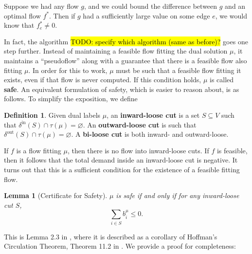 \documentclass[11pt]{article}
\newtheorem{lemma}[theorem]{Lemma}
\theoremstyle{definition}
\newtheorem{definition}{Definition}[section]
\theoremstyle{definition}
\newcommand{\biu}{b_{i}^{\mu}}
\newcommand{\din}{\delta^{\text{in}}}
\newcommand{\dout}{\delta^{\text{out}}}
\newcommand{\todo}[1]{\hl{TODO: #1}}
\begin{document}
	Suppose we had any flow $g$, and we could bound the difference between $g$ and an optimal
	flow $f^*$. Then if $g$ had a sufficiently large value on some edge $e$, we would know that
	$f^*_e \neq 0$.
	
	In fact, the algorithm \todo{specify which algorithm (same as before)?} goes one step further. Instead of maintaining a feasible flow
	fitting the dual solution $\mu$, it maintains a ``pseudoflow'' along with a guarantee
	that there is a feasible flow also fitting $\mu$. In order for this to work, $\mu$
	must be such that a feasible flow fitting it exists, even if that flow is never
	computed. If this condition holds, $\mu$ is called \textbf{safe}. An equivalent
	formulation of safety, which is easier to reason about, is as follows. To simplify
	the exposition, we define 
	\begin{definition}
		Given dual labels $\mu$, an \textbf{inward-loose cut} is a set $S \subseteq V$ such that
		$\din(S) \cap \tau(\mu) = \varnothing$. An \textbf{outward-loose cut}
		is such that $\dout(S) \cap \tau(\mu) = \varnothing$. A \textbf{bi-loose cut}
		is both inward- and outward-loose.
	\end{definition}
	If $f$ is a flow fitting $\mu$, then there is no flow into inward-loose cuts.
	If $f$ is feasible, then it follows that the total demand inside an inward-loose
	cut is negative. It turns out that this is a sufficient condition for the existence
	of a feasible fitting flow.
	\begin{lemma}[Certificate for Safety] \label{lem.safety}
	$\mu$ is safe if and only if for any inward-loose cut $S$,
	\[ \sum_{i \in S} \biu \leq 0. \]
	\end{lemma}
	This is Lemma 2.3 in \cite{Olver2017}, where it is described as a corollary of Hoffman's Circulation
	Theorem, Theorem 11.2 in \cite{Schrijver2002}. We provide a proof for completeness:
\end{document}
